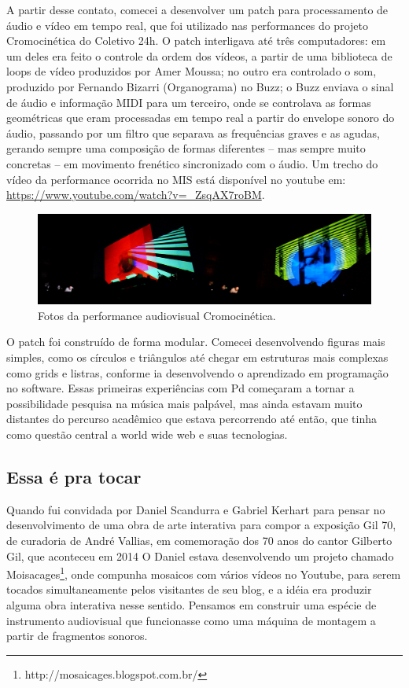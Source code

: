 A partir desse contato, comecei a desenvolver um patch para processamento de áudio e vídeo em tempo real, que foi utilizado nas performances do projeto Cromocinética do Coletivo 24h. O patch interligava até três computadores: em um deles era feito o controle da ordem dos vídeos, a partir de uma biblioteca de loops de vídeo produzidos por Amer Moussa; no outro era controlado o som, produzido por Fernando Bizarri (Organograma) no Buzz; o Buzz enviava o sinal de áudio e informação MIDI para um terceiro, onde se controlava as formas geométricas que eram processadas em tempo real a partir do envelope sonoro do áudio, passando por um filtro que separava as frequências graves e as agudas, gerando sempre uma composição de formas diferentes – mas sempre muito concretas – em movimento frenético sincronizado com o áudio. Um trecho do vídeo da performance ocorrida no MIS está disponível no youtube em:  \url{https://www.youtube.com/watch?v=_ZsqAX7roBM}.

\begin{figure}
\centering
\includegraphics[width=1\textwidth]{pictures/cap1/cromocinetica}
\caption{Fotos da performance audiovisual Cromocinética.}
\label{fig:cromocinetica}
\end{figure}

O patch foi construído de forma modular. Comecei desenvolvendo figuras mais simples, como os círculos e triângulos até chegar em estruturas mais complexas como grids e listras, conforme ia desenvolvendo o aprendizado em programação no software. Essas primeiras experiências com Pd começaram a tornar a possibilidade pesquisa na música mais palpável, mas ainda estavam muito distantes do percurso acadêmico que estava percorrendo até então, que tinha como questão central a world wide web e suas tecnologias.

\subsection{Essa é pra tocar}
Quando fui convidada por Daniel Scandurra e Gabriel Kerhart para pensar no desenvolvimento de uma obra de arte interativa para compor a exposição Gil 70, de curadoria de André Vallias, em comemoração dos 70 anos do cantor Gilberto Gil, que aconteceu em 2014 O Daniel estava desenvolvendo um projeto chamado Moisacages\footnote{http://mosaicages.blogspot.com.br/}, onde compunha mosaicos com vários vídeos no Youtube, para serem tocados simultaneamente pelos visitantes de seu blog, e a idéia era produzir alguma obra interativa nesse sentido. Pensamos em construir uma espécie de instrumento audiovisual que funcionasse como uma máquina de montagem a partir de fragmentos sonoros.


